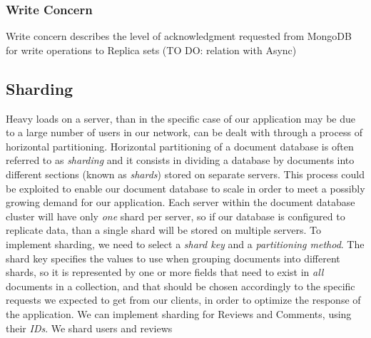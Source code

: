 \subsubsection{Write Concern}
Write concern describes the level of acknowledgment requested from MongoDB for write operations to Replica sets
(TO DO: relation with Async)
\subsection{Sharding}
Heavy loads on a server,  than in the specific case of our application may be due to a large number of users in our network, can be dealt with through a process of horizontal partitioning. Horizontal partitioning of a document database is often referred to as \emph{sharding} and it consists in dividing a database by documents into different sections (known as \emph{shards}) stored on separate servers. This process could be exploited to enable our document database to scale in order to meet a possibly growing demand for our application. Each server within the document database cluster will have only \emph{one} shard per server, so if our database is configured to replicate data, than a single shard will be stored on multiple servers. To implement sharding, we need to select a \emph{shard key} and a \emph{partitioning method}. The shard key specifies the values to use when grouping documents into different shards, so it is represented by one or more fields that need to exist in \emph{all} documents in a collection, and that should be chosen accordingly to the specific requests we expected to get from our clients, in order to optimize the response of the application. 
We can implement sharding for Reviews and Comments, using their \emph{IDs}. 
We shard users and reviews 

